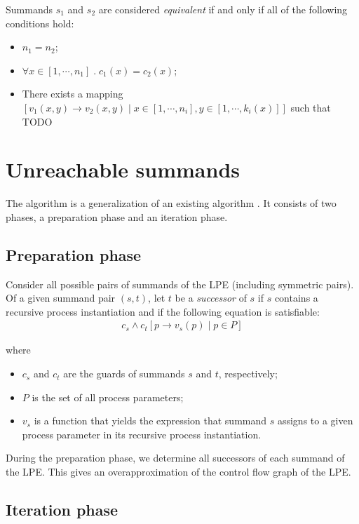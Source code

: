 Summands $s_1$ and $s_2$ are considered \emph{equivalent} if and only if all of the following conditions hold:

\begin{itemize}
\item $n_1 = n_2$;
\item $\forall x \in [1, \cdots{}, n_1] \;.\; c_1(x) = c_2(x)$;
\item There exists a mapping $[v_1(x,y) \rightarrow v_2(x,y) \;|\; x \in [1, \cdots{}, n_i], y \in [1, \cdots{}, k_i(x)]]$ such that TODO
\end{itemize}


\section{Unreachable summands}



The algorithm is a generalization of an existing algorithm \cite{van2009state}.
It consists of two phases, a preparation phase and an iteration phase.

\subsection{Preparation phase}

Consider all possible pairs of summands of the LPE (including symmetric pairs).
Of a given summand pair $(s, t)$, let $t$ be a \emph{successor} of $s$ if $s$ contains a recursive process instantiation and if the following equation is satisfiable:
\begin{align*}
c_s \land {c_t}[p \rightarrow v_s(p) \;|\; p \in P]
\end{align*}

where

\begin{itemize}
\item $c_s$ and $c_t$ are the guards of summands $s$ and $t$, respectively;
\item $P$ is the set of all process parameters;
\item $v_s$ is a function that yields the expression that summand $s$ assigns to a given process parameter in its recursive process instantiation.
\end{itemize}

During the preparation phase, we determine all successors of each summand of the LPE.
This gives an overapproximation of the control flow graph of the LPE.

\subsection{Iteration phase}

